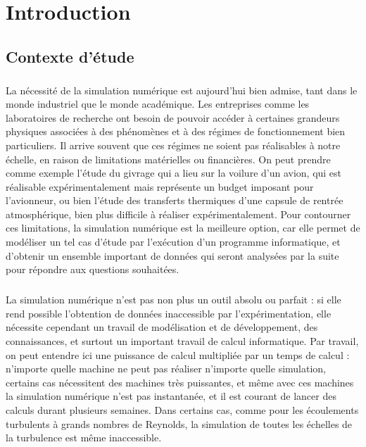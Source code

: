 \chapter{Introduction}

\section{Contexte d'étude}

	\paragraph{}
	La nécessité de la simulation numérique est aujourd'hui bien admise, tant dans le monde industriel que le monde académique.
	Les entreprises comme les laboratoires de recherche ont besoin de pouvoir accéder à certaines grandeurs physiques associées à des phénomènes et à des régimes de fonctionnement bien particuliers.
	Il arrive souvent que ces régimes ne soient pas réalisables à notre échelle, en raison de limitations matérielles ou financières.
	On peut prendre comme exemple l'étude du givrage qui a lieu sur la voilure d'un avion, qui est réalisable expérimentalement mais représente un budget imposant pour l’avionneur, ou bien l'étude des transferts thermiques d'une capsule de rentrée atmosphérique, bien plus difficile à réaliser expérimentalement.
	Pour contourner ces limitations, la simulation numérique est la meilleure option, car elle permet de modéliser un tel cas d'étude par l’exécution d'un programme informatique, et d'obtenir un ensemble important de données qui seront analysées par la suite pour répondre aux questions souhaitées.

	\paragraph{}
	La simulation numérique n'est pas non plus un outil absolu ou parfait : si elle rend possible l'obtention de données inaccessible par l'expérimentation, elle nécessite cependant un travail de modélisation et de développement, des connaissances, et surtout un important travail de calcul informatique.
	Par travail, on peut entendre ici une puissance de calcul multipliée par un temps de calcul : n'importe quelle machine ne peut pas réaliser n'importe quelle simulation, certains cas nécessitent des machines très puissantes, et même avec ces machines la simulation numérique n'est pas instantanée, et il est courant de lancer des calculs durant plusieurs semaines.
	Dans certains cas, comme pour les écoulements turbulents à grands nombres de Reynolds, la simulation de toutes les échelles de la turbulence est même inaccessible.

